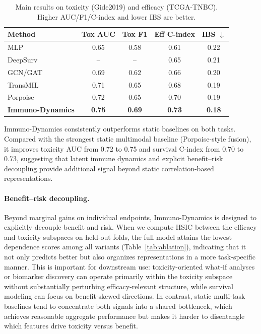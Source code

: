 \documentclass{article}
\begin{document}
\begin{table}[t]
\small
\centering
\setlength{\tabcolsep}{3pt}
\caption{Main results on toxicity (Gide2019) and efficacy (TCGA-TNBC). Higher AUC/F1/C-index and lower IBS are better.}
\label{tab:main_results}
\begin{tabularx}{\linewidth}{l c c c c}
\toprule
\textbf{Method} & \textbf{Tox AUC} & \textbf{Tox F1} & \textbf{Eff C-index} & \textbf{IBS} $\downarrow$ \\
\midrule
MLP        & 0.65 & 0.58 & 0.61 & 0.22 \\
DeepSurv   & --   & --   & 0.65 & 0.21 \\
GCN/GAT    & 0.69 & 0.62 & 0.66 & 0.20 \\
TransMIL   & 0.71 & 0.65 & 0.68 & 0.19 \\
Porpoise   & 0.72 & 0.65 & 0.70 & 0.19 \\
\midrule
\textbf{Immuno-Dynamics} & \textbf{0.75} & \textbf{0.69} & \textbf{0.73} & \textbf{0.18} \\
\bottomrule
\end{tabularx}
\end{table}

Immuno-Dynamics consistently outperforms static baselines on both tasks. Compared with the strongest static multimodal baseline (Porpoise-style fusion), it improves toxicity AUC from 0.72 to 0.75 and survival C-index from 0.70 to 0.73, suggesting that latent immune dynamics and explicit benefit--risk decoupling provide additional signal beyond static correlation-based representations.

\paragraph{Benefit--risk decoupling.}
Beyond marginal gains on individual endpoints, Immuno-Dynamics is designed to explicitly decouple benefit and risk. When we compute HSIC between the efficacy and toxicity subspaces on held-out folds, the full model attains the lowest dependence scores among all variants (Table~\ref{tab:ablation}), indicating that it not only predicts better but also organizes representations in a more task-specific manner. This is important for downstream use: toxicity-oriented what-if analyses or biomarker discovery can operate primarily within the toxicity subspace without substantially perturbing efficacy-relevant structure, while survival modeling can focus on benefit-skewed directions. In contrast, static multi-task baselines tend to concentrate both signals into a shared bottleneck, which achieves reasonable aggregate performance but makes it harder to disentangle which features drive toxicity versus benefit.
\end{document}
